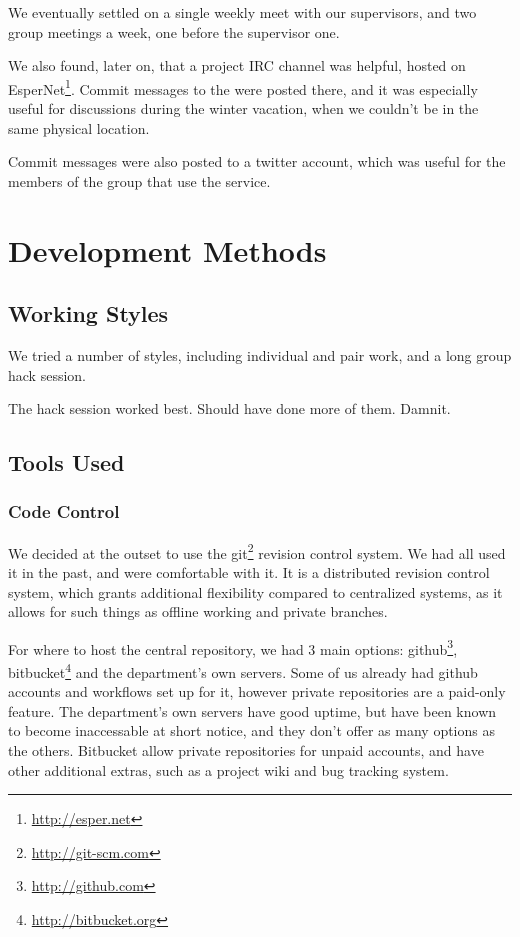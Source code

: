     We eventually settled on a single weekly meet with our supervisors, and two group meetings a week, one before the supervisor one.

    We also found, later on, that a project IRC channel was helpful, hosted on EsperNet\footnote{\url{http://esper.net}}.
    Commit messages to the were posted there, and it was especially useful for discussions during the winter vacation, when we couldn't be in the same physical location.

    Commit messages were also posted to a twitter account, which was useful for the members of the group that use the service.


\section{Development Methods}

  \subsection{Working Styles}
    We tried a number of styles, including individual and pair work, and a long group hack session.

    The hack session worked best.
    Should have done more of them.
    Damnit.

  \subsection{Tools Used}
    \subsubsection{Code Control}
      We decided at the outset to use the git\footnote{\url{http://git-scm.com}} revision control system.
      We had all used it in the past, and were comfortable with it.
      It is a distributed revision control system, which grants additional flexibility compared to centralized systems, as it allows for such things as offline working and private branches.

      For where to host the central repository, we had 3 main options: github\footnote{\url{http://github.com}}, bitbucket\footnote{\url{http://bitbucket.org}} and the department's own servers.
      Some of us already had github accounts and workflows set up for it, however private repositories are a paid-only feature.
      The department's own servers have good uptime, but have been known to become inaccessable at short notice, and they don't offer as many options as the others.
      Bitbucket allow private repositories for unpaid accounts, and have other additional extras, such as a project wiki and bug tracking system.

